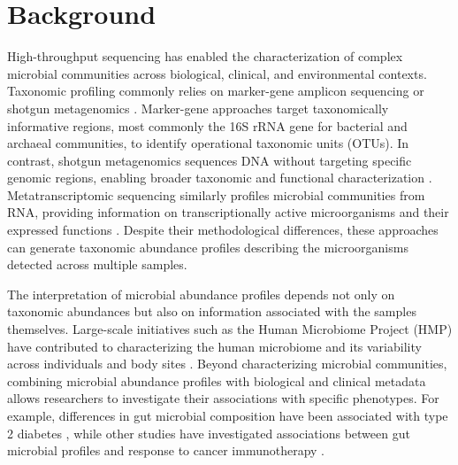 \documentclass[pdflatex,sn-vancouver-num]{sn-jnl}%
\theoremstyle{thmstyleone}%
\theoremstyle{thmstyletwo}%
\theoremstyle{thmstylethree}%
\begin{document}

\maketitle


\section{Background}\label{sec1}

High-throughput sequencing has enabled the characterization of complex microbial communities across biological, clinical, and environmental contexts. Taxonomic profiling commonly relies on marker-gene amplicon sequencing or shotgun metagenomics \cite{jovel_characterization_2016,durazzi_comparison_2021}. Marker-gene approaches target taxonomically informative regions, most commonly the 16S rRNA gene for bacterial and archaeal communities, to identify operational taxonomic units (OTUs). In contrast, shotgun metagenomics sequences DNA without targeting specific genomic regions, enabling broader taxonomic and functional characterization \cite{jovel_characterization_2016,durazzi_comparison_2021,breitwieser_review_2019}. Metatranscriptomic sequencing similarly profiles microbial communities from RNA, providing information on transcriptionally active microorganisms and their expressed functions \cite{breitwieser_review_2019,bashiardes_use_2016}. Despite their methodological differences, these approaches can generate taxonomic abundance profiles describing the microorganisms detected across multiple samples.

The interpretation of microbial abundance profiles depends not only on taxonomic abundances but also on information associated with the samples themselves. Large-scale initiatives such as the Human Microbiome Project (HMP) have contributed to characterizing the human microbiome and its variability across individuals and body sites \citep{huttenhower_structure_2012,proctor_integrative_2019}. Beyond characterizing microbial communities, combining microbial abundance profiles with biological and clinical metadata allows researchers to investigate their associations with specific phenotypes. For example, differences in gut microbial composition have been associated with type 2 diabetes \citep{qin_metagenome-wide_2012}, while other studies have investigated associations between gut microbial profiles and response to cancer immunotherapy \citep{routy_gut_2018,gopalakrishnan_gut_2018}.
\end{document}
